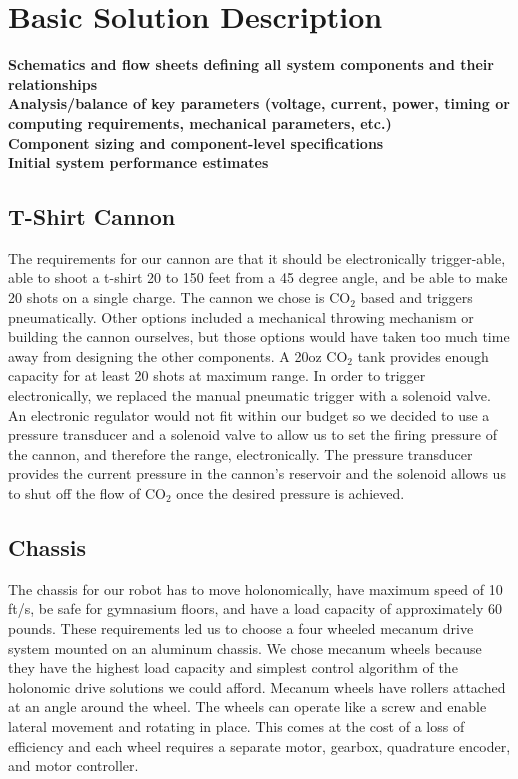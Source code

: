 \documentclass[letterpaper,12pt]{article}
\newcommand{\xxx}[1]{{\color{red}\bf #1}}
\begin{document}
\section{Basic Solution Description}
\label{sec:basicsoldesc}

\xxx{Schematics and flow sheets defining all system components and their relationships}\\
\xxx{Analysis/balance of key parameters (voltage, current, power, timing or computing requirements, mechanical parameters, etc.)}\\
\xxx{Component sizing and component-level specifications}\\
\xxx{Initial system performance estimates}

\subsection{T-Shirt Cannon}
The requirements for our cannon are that it should be electronically
trigger-able, able to shoot a t-shirt 20 to 150 feet from a 45 degree angle,
and be able to make 20 shots on a single charge. The cannon we chose is CO$_2$
based and triggers pneumatically. Other options included a mechanical throwing
mechanism or building the cannon ourselves, but those options would have taken
too much time away from designing the other components. A 20oz CO$_2$ tank
provides enough capacity for at least 20 shots at maximum range. In order to
trigger electronically, we replaced the manual pneumatic trigger with
a solenoid valve. An electronic regulator would not fit within our budget so we
decided to use a pressure transducer and a solenoid valve to allow us to set
the firing pressure of the cannon, and therefore the range, electronically. The
pressure transducer provides the current pressure in the cannon's reservoir and
the solenoid allows us to shut off the flow of CO$_2$ once the desired pressure
is achieved.\\

\subsection{Chassis}
The chassis for our robot has to move holonomically, have maximum speed of 10
ft/s, be safe for gymnasium floors, and have a load capacity of approximately
60 pounds. These requirements led us to choose a four wheeled mecanum drive
system mounted on an aluminum chassis. We chose mecanum wheels because they
have the highest load capacity and simplest control algorithm of the holonomic
drive solutions we could afford. Mecanum wheels have rollers attached at an
angle around the wheel. The wheels can operate like a screw and enable lateral
movement and rotating in place. This comes at the cost of a loss of efficiency
and each wheel requires a separate motor, gearbox, quadrature encoder, and
motor controller.\\
\end{document}
